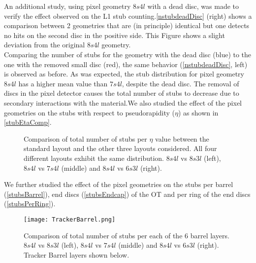 An additional study, using pixel geometry $8s4l$ with a dead disc, was made to verify the effect observed on the L1 stub counting.\autoref{nstubdeadDisc} (right) shows a comparison between 2 geometries that are (in principle) identical but one detects no hits on the second disc in the positive side. This Figure shows a slight deviation from the original $8s4l$ geometry.\\

Comparing the number of stubs for the geometry with the dead disc (blue) to the one with the removed small disc (red), the same behavior (\autoref{nstubdeadDisc}, left) is observed as before. As was expected, the stub distribution for pixel geometry $8s4l$ has a higher mean value than $7s4l$, despite the dead disc. The removal of discs in the pixel detector causes the total number of stubs to decrease due to secondary interactions with the material.We also studied the effect of the pixel geometries on the stubs with respect to pseudorapidity ($\eta$) as shown in \autoref{stubEtaComp}. 

\begin{figure}[H]
    \centering
     \caption{Comparison of total number of stubs per $\eta$ value between the standard layout and the other three layouts considered. All four different layouts exhibit the same distribution. $8s4l$ vs $8s3l$ (left), $8s4l$ vs $7s4l$ (middle) and $8s4l$ vs $6s3l$ (right).}
\label{stubEtaComp}
\end{figure}

\vspace{1em}

We further studied the effect of the pixel geometries on the stubs per barrel (\autoref{stubsBarrel}), end discs (\autoref{stubsEndcap})  of the OT and per ring of the end discs (\autoref{stubsPerRing}).

\begin{figure}[H]
    \centering
\texttt{[image: TrackerBarrel.png]}
  \caption{Comparison of total number of stubs per each of the 6 barrel layers. $8s4l$ vs $8s3l$ (left), $8s4l$ vs $7s4l$ (middle) and $8s4l$ vs $6s3l$ (right). Tracker Barrel layers shown below.}
\label{stubsBarrel}
\end{figure}

